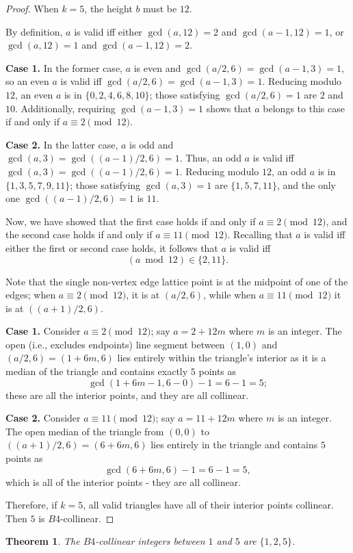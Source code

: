 \documentclass{article}
\theoremstyle{mydefstyle}
\newtheorem{theorem}{Theorem}
\begin{document}
\begin{proof}
When $k=5$, the height $b$ must be $12$. 

By definition, $a$ is valid iff either $\gcd(a,12)=2$ and $\gcd(a-1,12)=1$, or $\gcd(a,12)=1$ and $\gcd(a-1,12)=2$. 

\textbf{Case 1.} In the former case, $a$ is even and $\gcd(a/2,6)=\gcd(a-1,3)=1$, so an even $a$ is valid iff $\gcd(a/2,6)=\gcd(a-1,3)=1$. Reducing modulo $12$, an even $a$ is in $\{0,2,4,6,8,10\}$; those satisfying $\gcd(a/2,6)=1$ are $2$ and $10$. Additionally, requiring $\gcd(a-1,3)=1$ shows that $a$ belongs to this case if and only if $a\equiv2\pmod{12}$. 

\textbf{Case 2.} In the latter case, $a$ is odd and $\gcd(a,3)=\gcd((a-1)/2,6)=1$. Thus, an odd $a$ is valid iff $\gcd(a,3)=\gcd((a-1)/2,6)=1$. Reducing modulo $12$, an odd $a$ is in $\{1,3,5,7,9,11\}$; those satisfying $\gcd(a,3)=1$ are $\{1,5,7,11\}$, and the only one $\gcd((a-1)/2,6)=1$ is $11$. 

Now, we have showed that the first case holds if and only if $a\equiv2\pmod{12}$, and the second case holds if and only if $a\equiv11\pmod{12}$. Recalling that $a$ is valid iff either the first or second case holds, it follows that $a$ is valid iff \[(a\bmod12)\in\{2,11\}.\] 

Note that the single non-vertex edge lattice point is at the midpoint of one of the edges; when $a\equiv2\pmod{12}$, it is at $(a/2,6)$, while when $a\equiv11\pmod{12}$ it is at $((a+1)/2,6)$. 

\textbf{Case 1.} Consider $a\equiv2\pmod{12}$; say $a=2+12m$ where $m$ is an integer. The open (i.e., excludes endpoints) line segment between $(1,0)$ and $(a/2,6)=(1+6m,6)$ lies entirely within the triangle's interior as it is a median of the triangle and contains exactly $5$ points as \[\gcd(1+6m-1,6-0)-1=6-1=5;\] these are all the interior points, and they are all collinear. 

\textbf{Case 2.} Consider $a\equiv11\pmod{12}$; say $a=11+12m$ where $m$ is an integer. The open median of the triangle from $(0,0)$ to $((a+1)/2,6)=(6+6m,6)$ lies entirely in the triangle and contains $5$ points as \[\gcd(6+6m,6)-1=6-1=5,\] which is all of the interior points - they are all collinear. 

Therefore, if $k=5$, all valid triangles have all of their interior points collinear. Then $5$ is $B4$-collinear. 
\end{proof}

\begin{theorem}
\label{smaller:label}
The $B4$-collinear integers between $1$ and $5$ are $\{1,2,5\}$. 
\end{theorem}
\end{document}
